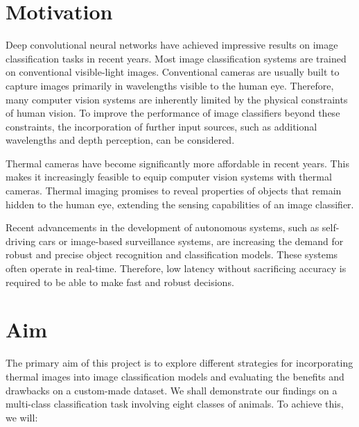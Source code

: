 \documentclass{l4proj}
\begin{document}



\section{Motivation}

Deep convolutional neural networks have achieved impressive results on image classification tasks in recent years. Most image classification systems are trained on conventional visible-light images. Conventional cameras are usually built to capture images primarily in wavelengths visible to the human eye. Therefore, many computer vision systems are inherently limited by the physical constraints of human vision. To improve the performance of image classifiers beyond these constraints, the incorporation of further input sources, such as additional wavelengths and depth perception, can be considered.

Thermal cameras have become significantly more affordable in recent years. This makes it increasingly feasible to equip computer vision systems with thermal cameras. Thermal imaging promises to reveal properties of objects that remain hidden to the human eye, extending the sensing capabilities of an image classifier.

Recent advancements in the development of autonomous systems, such as self-driving cars or image-based surveillance systems, are increasing the demand for robust and precise object recognition and classification models. These systems often operate in real-time. Therefore, low latency without sacrificing accuracy is required to be able to make fast and robust decisions.


\section{Aim}

The primary aim of this project is to explore different strategies for incorporating thermal images into image classification models and evaluating the benefits and drawbacks on a custom-made dataset. We shall demonstrate our findings on a multi-class classification task involving eight classes of animals. To achieve this, we will:
\end{document}
